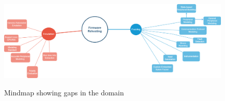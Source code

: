 \begin{figure}[ht]
    \begin{center}
        \centering
    \includegraphics[width=6.5in]{images/mindmap.drawio.png}
    \caption{Mindmap showing gaps in the domain}
    \centering
    \label{fig:figure1}
    \end{center}    
\end{figure}